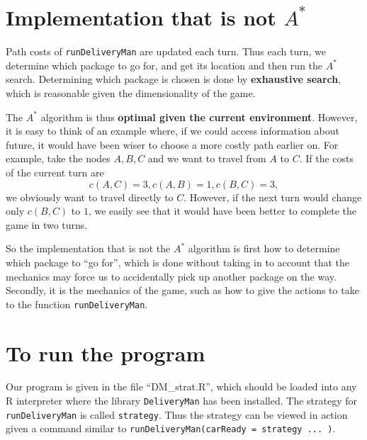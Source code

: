 \section{Implementation that is not $A^*$}

Path costs of \texttt{runDeliveryMan} are updated each turn. Thus each turn, we determine which package to go for, and get its location and then run the $A^*$ search. Determining which package is chosen is done by \textbf{exhaustive search}, which is reasonable given the dimensionality of the game.

The $A^*$ algorithm is thus \textbf{optimal given the current environment}. However, it is easy to think of an example where, if we could access information about future, it would have been wiser to choose a more costly path earlier on. For example, take the nodes $A, B, C$ and we want to travel from $A$ to $C$. If the costs of the current turn are
$$c(A, C) = 3, c(A, B) = 1, c(B, C) = 3,$$
we obviously want to travel directly to $C$. However, if the next turn would change only $c(B, C)$ to $1$, we easily see that it would have been better to complete the game in two turns.

So the implementation that is not the $A^*$ algorithm is first how to determine which package to ``go for'', which is done without taking in to account that the mechanics may force us to accidentally pick up another package on the way. Secondly, it is the mechanics of the game, such as how to give the actions to take to the function \texttt{runDeliveryMan}.

\section{To run the program}

Our program is given in the file ``DM\_strat.R'', which should be loaded into any R interpreter where the library \texttt{DeliveryMan} has been installed. The strategy for \texttt{runDeliveryMan} is called \texttt{strategy}. Thus the strategy can be viewed in action given a command similar to \texttt{runDeliveryMan(carReady = strategy ... )}.